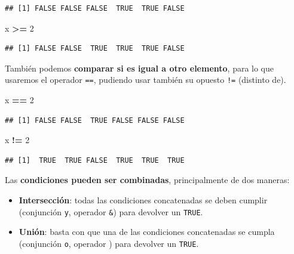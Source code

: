 \documentclass[11pt,]{book}
\newenvironment{Shaded}{\begin{snugshade}}{\end{snugshade}}
\newcommand{\DecValTok}[1]{\textcolor[rgb]{0.06,0.06,0.06}{#1}}
\newcommand{\NormalTok}[1]{#1}
\newcommand{\OperatorTok}[1]{\textcolor[rgb]{0.43,0.43,0.43}{\textbf{#1}}}
\newcommand{\StringTok}[1]{\textcolor[rgb]{0.5,0.5,0.5}{#1}}
\begin{document}
\begin{verbatim}
## [1] FALSE FALSE FALSE  TRUE  TRUE FALSE
\end{verbatim}

\begin{Shaded}
\begin{Highlighting}[]
\NormalTok{x }\OperatorTok{>=}\StringTok{ }\DecValTok{2}
\end{Highlighting}
\end{Shaded}

\begin{verbatim}
## [1] FALSE FALSE  TRUE  TRUE  TRUE FALSE
\end{verbatim}

También podemos \textbf{comparar si es igual a otro elemento}, para lo que usaremos el operador \texttt{==}, pudiendo usar también su opuesto \texttt{!=} (distinto de).

\begin{Shaded}
\begin{Highlighting}[]
\NormalTok{x }\OperatorTok{==}\StringTok{ }\DecValTok{2}
\end{Highlighting}
\end{Shaded}

\begin{verbatim}
## [1] FALSE FALSE  TRUE FALSE FALSE FALSE
\end{verbatim}

\begin{Shaded}
\begin{Highlighting}[]
\NormalTok{x }\OperatorTok{!=}\StringTok{ }\DecValTok{2}
\end{Highlighting}
\end{Shaded}

\begin{verbatim}
## [1]  TRUE  TRUE FALSE  TRUE  TRUE  TRUE
\end{verbatim}

Las \textbf{condiciones pueden ser combinadas}, principalmente de dos maneras:

\begin{itemize}
\item
  \textbf{Intersección}: todas las condiciones concatenadas se deben cumplir (conjunción \texttt{y}, operador \texttt{\&}) para devolver un \texttt{TRUE}.
\item
  \textbf{Unión}: basta con que una de las condiciones concatenadas se cumpla (conjunción \texttt{o}, operador \texttt{\textbar{}}) para devolver un \texttt{TRUE}.
\end{itemize}
\end{document}
